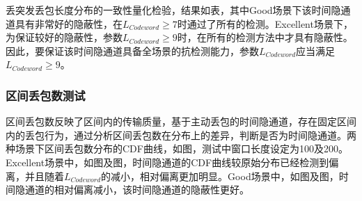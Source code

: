 
丢突发丢包长度分布的一致性量化检验，结果如表，其中Good场景下该时间隐通道具有非常好的隐蔽性，在$L_{Codeword}\ge 7$时通过了所有的检测。Excellent场景下，为保证较好的隐蔽性，参数$L_{Codeword}\ge 9$时，在所有的检测方法中才具有隐蔽性。因此，要保证该时间隐通道具备全场景的抗检测能力，参数$L_{Codeword}$应当满足$L_{Codeword}\ge 9$。

\subsubsection{区间丢包数测试}
\label{chap:hash:result:undetectability:plr}

区间丢包数反映了区间内的传输质量，基于主动丢包的时间隐通道，存在固定区间内的丢包行为，通过分析区间丢包数在分布上的差异，判断是否为时间隐通道。两种场景下区间丢包数分布的CDF曲线，如图，测试中窗口长度设定为100及200。Excellent场景中，如图及图，时间隐通道的CDF曲线较原始分布已经检测到偏离，并且随着$L_{Codeword}$的减小，相对偏离更加明显。Good场景中，如图及图，时间隐通道的相对偏离减小，该时间隐通道的隐蔽性更好。

